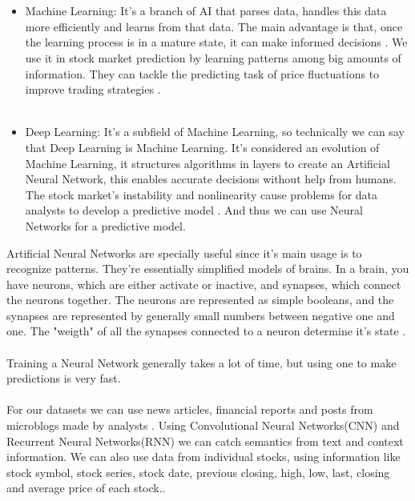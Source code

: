 \documentclass[conference]{IEEEtran}
\begin{document}
\\\\
\begin{itemize}
  \item Machine Learning: It's a branch of AI that parses data, handles this data more efficiently and learns from that data. The main advantage is that, once
  the learning process is in a mature state, it can make informed decisions \cite{dey2016machine}. We use it in stock market prediction by learning patterns among big amounts of information.
  They can tackle the predicting task of price fluctuations to improve trading strategies \cite{nabipour2020predicting}.
  \\\\
  \item Deep Learning: It's a subfield of Machine Learning, so technically we can say that Deep Learning is Machine Learning.
  It's considered an evolution of Machine Learning, it structures algorithms in layers to create an Artificial Neural Network, this enables accurate decisions
  without help from humans. The stock market's instability and nonlinearity cause problems for data analysts to develop a predictive model \cite{nabipour2020predicting}. And thus we can use Neural Networks for a predictive model.
\end{itemize}
Artificial Neural Networks are specially useful since it's main usage is to recognize patterns. They're essentially simplified models of brains. In a brain, you have neurons, which are either activate or inactive,
and synapses, which connect the neurons together. The neurons are represented as simple booleans, and the synapses are represented by generally small numbers between negative one and one. The "weigth" of all the
synapses connected to a neuron determine it's state \cite{M2018}.
\\\\
Training a Neural Network generally takes a lot of time, but using one to make predictions is very fast.
\\\\
For our datasets we can use news articles, financial reports and posts from microblogs made by analysts \cite{Vargas2017}. Using Convolutional Neural Networks(CNN) and Recurrent Neural Networks(RNN) we can
catch semantics from text and context information. We can also use data from individual stocks, using information like stock symbol, stock series, stock date, previous closing, high, low, last, closing and average price of each stock.\cite{M2018}.
\\\\
\end{document}
